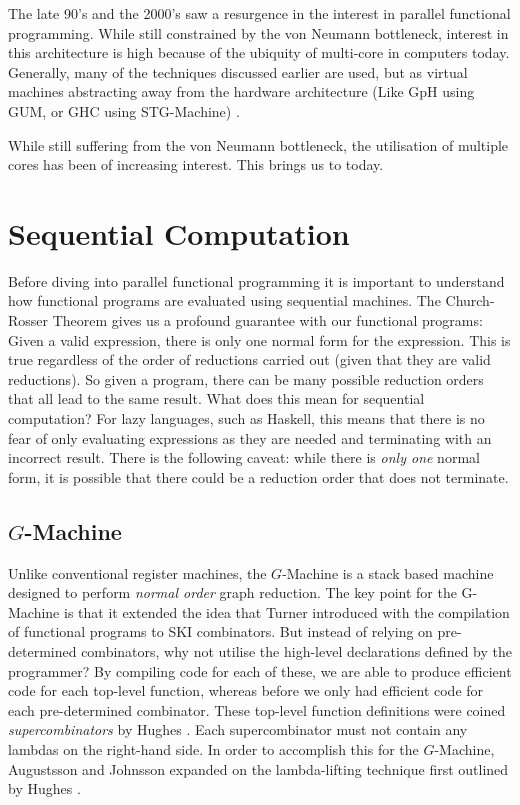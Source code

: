     The late 90's and the 2000's saw a resurgence in the interest in parallel
functional programming. While still constrained by the von Neumann bottleneck, 
interest in this architecture is high because of the ubiquity of multi-core in 
computers today. Generally, many of the techniques discussed earlier are used, but as virtual
machines abstracting away from the hardware architecture (Like GpH using GUM, or
GHC using STG-Machine) \cite{buckwheat, haskellSharedMem}. 


While still suffering from the von Neumann bottleneck, the
utilisation of multiple cores has been of increasing interest. This brings us to
today.

\section{Sequential Computation}
    Before diving into parallel functional programming it is important to
understand how functional programs are evaluated using sequential machines. 
The Church-Rosser Theorem gives us a profound guarantee with our functional
programs: Given a valid expression, there is only one normal form for the
expression. This is true regardless of the order of reductions carried out
(given that they are valid reductions). So given a program, there can be many
possible reduction orders that all lead to the same result. What does this mean
for sequential computation? For lazy languages, such as Haskell, this means that
there is no fear of only evaluating expressions as they are needed and
terminating with an incorrect result. There is the following caveat: while there
is \emph{only one} normal form, it is possible that there could be a reduction
order that does not terminate.  

 \subsection{$G$-Machine}
    Unlike conventional register machines, the $G$-Machine is a stack based
machine designed to perform \emph{normal order} graph reduction.
    The key point for the G-Machine \cite{Augustsson:LazyMLCompiler}
is that it extended the idea that Turner introduced
with the compilation of functional programs to SKI combinators. 
But instead of relying on pre-determined combinators, why not
utilise the high-level declarations defined by the programmer? By compiling 
code for each of these, we are able to produce
efficient code for each top-level function, whereas before we only had efficient
code for each pre-determined combinator. These top-level function definitions
were coined \emph{supercombinators} by Hughes \cite{hughes:thesis}. Each 
supercombinator must not contain any lambdas on the right-hand side. In order to 
accomplish this for the $G$-Machine, Augustsson and
Johnsson expanded on the lambda-lifting technique first outlined by Hughes
\cite{Augustsson:LazyMLCompiler, hughes:thesis}. 
    
